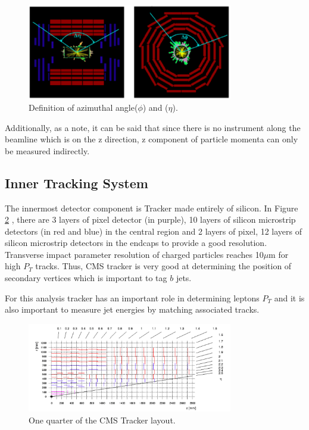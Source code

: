 \documentclass[12pt,oneandhalf,chaparabic,phys,ms,eng]{metu}
\begin{document}
\begin{figure}  [!hbt]
\centering
    \includegraphics[width=0.8\textwidth]{DeltaR}
    \caption{\label{DeltaR} Definition of azimuthal angle($\phi$) and ($\eta$).}
\end{figure}

Additionally, as a note, it can be said that since there is no instrument along the beamline which is on the z direction, z component of particle momenta can only be measured indirectly.

\subsection{Inner Tracking System}

The innermost detector component is Tracker made entirely of silicon. In Figure \ref{Tracker} , there are 3 layers of pixel detector (in purple), 10 layers of silicon microstrip detectors (in red and blue) in the central region and 2 layers of pixel, 12 layers of silicon microstrip detectors in the endcaps to provide a good resolution.  Transverse impact parameter resolution of charged particles reaches 10$\mu$m for high $P_{T}$ tracks. Thus, CMS tracker is very good at determining the position of secondary vertices which is important to tag $b$ jets. 

For this analysis tracker has an important role in determining leptons $P_{T}$ and it is also important to measure jet energies by matching associated tracks.

\begin{figure}  [!hbt]
\centering
    \includegraphics[width=0.8\textwidth]{Tracker}
    \caption{\label{Tracker}One quarter of the CMS Tracker layout. ~\cite{R15}}
\end{figure}
\end{document}
